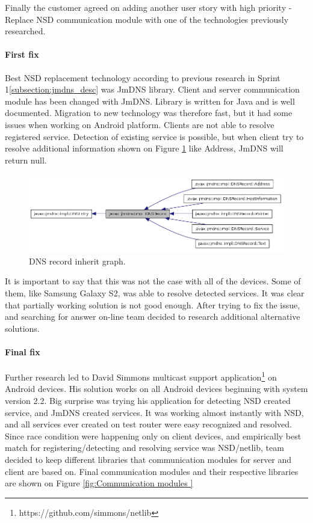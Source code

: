 Finally the customer agreed on adding another user story with high priority - Replace NSD communication module with one of the technologies previously researched.

\paragraph{First fix}
Best NSD replacement technology according to previous research in Sprint 1\ref{subsection:jmdns_desc} was JmDNS library. 
Client and server communication module has been changed with JmDNS. Library is written for Java and is well documented.
Migration to new technology was therefore fast, but it had some issues when working on Android platform. Clients are not able to resolve registered service.
Detection of existing service is possible, but when client try to resolve additional information shown on Figure \ref{fig:DNS record inherit graph } like Address, JmDNS will return null.

\begin{figure}[H]
	\centering
		\includegraphics[width=17cm]{sprint5/jmdns.png}
	\caption{DNS record inherit graph.}
	\label{fig:DNS record inherit graph }
\end{figure}

It is important to say that this was not the case with all of the devices. Some of them, like Samsung Galaxy S2, was able to resolve detected services. It was clear that partially working solution is not good enough. After trying to fix the issue, and searching for answer on-line team decided to research additional alternative solutions.

\paragraph{Final fix}
Further research led to David Simmons multicast support application\footnote{https://github.com/simmons/netlib} on Android devices. His solution works on all Android devices beginning with system version 2.2. Big surprise was trying his application for detecting NSD created service, and JmDNS created services. It was working almost instantly with NSD, and all services ever created on test router were easy recognized and resolved. Since race condition were happening only on client devices, and empirically best match for registering/detecting and resolving service was NSD/netlib, team decided to keep different libraries that communication modules for server and client are based on. Final communication modules and their respective libraries are shown on Figure \ref{fig:Communication modules }

